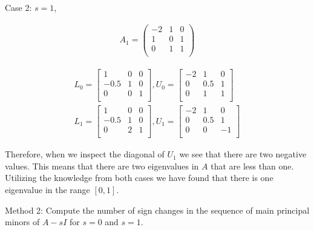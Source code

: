 Case 2: \(s=1\),


\begin{eqnarray}
  A_1 = 
  \begin{pmatrix}
    -2 & 1 & 0 \\
    1 & 0 & 1 \\
    0 & 1 & 1 \\
  \end{pmatrix}
\end{eqnarray}

\begin{eqnarray}
  L_0 =
  \begin{bmatrix}
    1 & 0 & 0 \\
    -0.5 & 1 & 0 \\
    0 & 0 & 1 \\
  \end{bmatrix}
  , U_0 =
  \begin{bmatrix}
    -2 & 1 & 0 \\
    0 & 0.5 & 1 \\
    0 & 1 & 1 \\
  \end{bmatrix}
  \\
  L_1 = 
  \begin{bmatrix}
    1 & 0 & 0 \\
    -0.5 & 1 & 0 \\
    0 & 2 & 1 \\
  \end{bmatrix}
  , U_1 = 
  \begin{bmatrix}
    -2 & 1 & 0 \\
    0 & 0.5 & 1 \\
    0 & 0 & -1 \\
  \end{bmatrix}
\end{eqnarray}

Therefore, when we inspect the diagonal of \(U_1\) we see that there are two negative values.
This means that there are two eigenvalues in \(A\) that are less than one.
Utilizing the knowledge from both cases we have found that there is one eigenvalue in the range \([0,1]\).

\newpage
Method 2: Compute the number of sign changes in the sequence of main principal minors of \(A-sI\) for \(s=0\) and \(s=1\).




